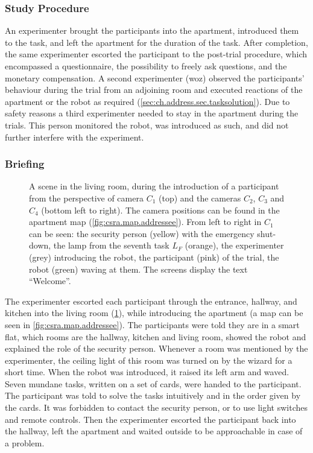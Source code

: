 \subsubsection{Study Procedure}

An experimenter brought the participants into the \gls{apartment}, introduced them to the task, and left the \gls{apartment} for the duration of the task.
After completion, the same experimenter escorted the participant to the post-trial procedure, which encompassed a questionnaire, the possibility to freely ask questions, and the monetary compensation.
A second experimenter (\gls{woz}) observed the participants' behaviour during the trial from an adjoining room and executed reactions of the \gls{apartment} or the \gls{robot} as required (\cref{sec:ch.address.sec.tasksolution}).
Due to safety reasons a third experimenter needed to stay in the \gls{apartment} during the trials.
This person monitored the \gls{robot}, was introduced as such, and did not further interfere with the experiment.

\subsubsection{Briefing}

\begin{figure}[tbh]
    \centering
    \def\svgwidth{1.0\textwidth}
    
    \caption[Addressing apartment study camera perspectives.]{\label{fig:study.addressee.views} 
    A scene in the living room, during the introduction of a participant from the perspective of camera \(C_1\) (top) and the cameras \(C_2\), \(C_3\) and \(C_4\) (bottom left to right). 
    The camera positions can be found in the \gls{apartment} map (\cref{fig:csra.map.addressee}).
    From left to right in \(C_1\) can be seen: the security person (yellow) with the emergency shut-down, the lamp from the seventh task \(L_F\) (orange), the experimenter (grey) introducing the \gls{robot}, the participant (pink) of the trial, the \gls{robot} (green) waving at them. 
    The screens display the text \enquote{Welcome}.
    }
\end{figure}

The experimenter escorted each participant through the entrance, hallway, and kitchen into the living room (\cref{fig:study.addressee.views}), while introducing the \gls{apartment} (a map can be seen in \cref{fig:csra.map.addressee}).
The participants were told they are in a smart flat, which rooms are the hallway, kitchen and living room, showed the \gls{robot} and explained the role of the security person.
Whenever a room was mentioned by the experimenter, the ceiling light of this room was turned on by the \gls{wizard} for a short time.
When the \gls{robot} was introduced, it raised its left arm and waved.
Seven mundane tasks, written on a set of cards, were handed to the participant.
The participant was told to solve the tasks intuitively and in the order given by the cards.
It was forbidden to contact the security person, or to use light switches and remote controls.
Then the experimenter escorted the participant back into the hallway, left the \gls{apartment} and waited outside to be approachable in case of a problem. 

